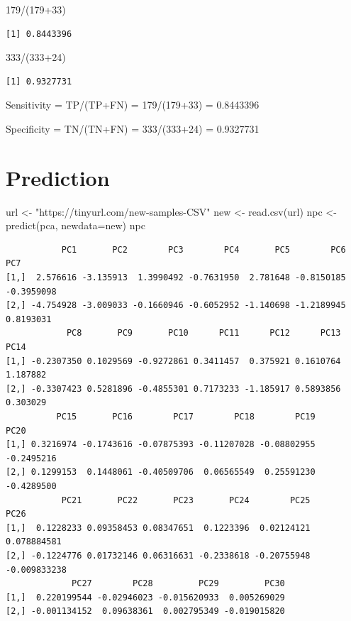 \documentclass[
  letterpaper,
  DIV=11,
  numbers=noendperiod]{scrartcl}
\newenvironment{Shaded}{\begin{snugshade}}{\end{snugshade}}
\newcommand{\AttributeTok}[1]{\textcolor[rgb]{0.40,0.45,0.13}{#1}}
\newcommand{\DecValTok}[1]{\textcolor[rgb]{0.68,0.00,0.00}{#1}}
\newcommand{\FunctionTok}[1]{\textcolor[rgb]{0.28,0.35,0.67}{#1}}
\newcommand{\NormalTok}[1]{\textcolor[rgb]{0.00,0.23,0.31}{#1}}
\newcommand{\OtherTok}[1]{\textcolor[rgb]{0.00,0.23,0.31}{#1}}
\newcommand{\SpecialCharTok}[1]{\textcolor[rgb]{0.37,0.37,0.37}{#1}}
\newcommand{\StringTok}[1]{\textcolor[rgb]{0.13,0.47,0.30}{#1}}
\begin{document}
\begin{Shaded}
\begin{Highlighting}[]
\DecValTok{179}\SpecialCharTok{/}\NormalTok{(}\DecValTok{179}\SpecialCharTok{+}\DecValTok{33}\NormalTok{)}
\end{Highlighting}
\end{Shaded}

\begin{verbatim}
[1] 0.8443396
\end{verbatim}

\begin{Shaded}
\begin{Highlighting}[]
\DecValTok{333}\SpecialCharTok{/}\NormalTok{(}\DecValTok{333}\SpecialCharTok{+}\DecValTok{24}\NormalTok{)}
\end{Highlighting}
\end{Shaded}

\begin{verbatim}
[1] 0.9327731
\end{verbatim}

Sensitivity = TP/(TP+FN) = 179/(179+33) = 0.8443396

Specificity = TN/(TN+FN) = 333/(333+24) = 0.9327731

\hypertarget{prediction}{%
\section{Prediction}\label{prediction}}

\begin{Shaded}
\begin{Highlighting}[]
\NormalTok{url }\OtherTok{\textless{}{-}} \StringTok{"https://tinyurl.com/new{-}samples{-}CSV"}
\NormalTok{new }\OtherTok{\textless{}{-}} \FunctionTok{read.csv}\NormalTok{(url)}
\NormalTok{npc }\OtherTok{\textless{}{-}} \FunctionTok{predict}\NormalTok{(pca, }\AttributeTok{newdata=}\NormalTok{new)}
\NormalTok{npc}
\end{Highlighting}
\end{Shaded}

\begin{verbatim}
           PC1       PC2        PC3        PC4       PC5        PC6        PC7
[1,]  2.576616 -3.135913  1.3990492 -0.7631950  2.781648 -0.8150185 -0.3959098
[2,] -4.754928 -3.009033 -0.1660946 -0.6052952 -1.140698 -1.2189945  0.8193031
            PC8       PC9       PC10      PC11      PC12      PC13     PC14
[1,] -0.2307350 0.1029569 -0.9272861 0.3411457  0.375921 0.1610764 1.187882
[2,] -0.3307423 0.5281896 -0.4855301 0.7173233 -1.185917 0.5893856 0.303029
          PC15       PC16        PC17        PC18        PC19       PC20
[1,] 0.3216974 -0.1743616 -0.07875393 -0.11207028 -0.08802955 -0.2495216
[2,] 0.1299153  0.1448061 -0.40509706  0.06565549  0.25591230 -0.4289500
           PC21       PC22       PC23       PC24        PC25         PC26
[1,]  0.1228233 0.09358453 0.08347651  0.1223396  0.02124121  0.078884581
[2,] -0.1224776 0.01732146 0.06316631 -0.2338618 -0.20755948 -0.009833238
             PC27        PC28         PC29         PC30
[1,]  0.220199544 -0.02946023 -0.015620933  0.005269029
[2,] -0.001134152  0.09638361  0.002795349 -0.019015820
\end{verbatim}
\end{document}
